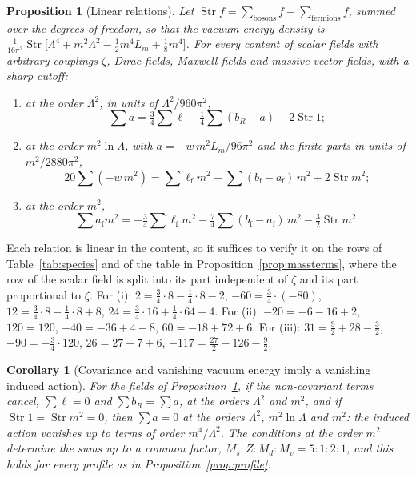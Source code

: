 \documentclass[11pt,a4paper]{article}
\makeatletter
\theoremstyle{stmt}
\newtheorem{proposition}[theorem]{Proposition}
\newtheorem{corollary}[theorem]{Corollary}
\theoremstyle{defn}
\theoremstyle{rmk}
\renewenvironment{proof}[1][\proofname]{\par\pushQED{\qed}\normalfont\topsep6\p@\@plus6\p@\relax
  \trivlist\item[\hskip\labelsep{\sffamily\itshape\small #1.}]\ignorespaces}{\popQED\endtrivlist\@endpefalse}
\numberwithin{equation}{section}
\makeatother
\begin{document}
\begin{proposition}[Linear relations]\label{prop:relations}
Let $\operatorname{Str}f=\sum_{\mathrm{bosons}}f-\sum_{\mathrm{fermions}}f$, summed over the degrees of freedom, so that the vacuum energy density is $\frac1{16\pi^2}\operatorname{Str}\big[\Lambda^4+m^2\Lambda^2-\tfrac12m^4L_m+\tfrac18m^4\big]$. For every content of scalar fields with arbitrary couplings $\zeta$, Dirac fields, Maxwell fields and massive vector fields, with a sharp cutoff:
\begin{enumerate}[label=\textup{(\roman*)}]
\item at the order $\Lambda^2$, in units of $\Lambda^2/960\pi^2$,
\[
\sum a=\tfrac34\sum\ell-\tfrac14\sum(b_R-a)-2\operatorname{Str}1;
\]
\item at the order $m^2\ln\Lambda$, with $a=-w\,m^2L_m/96\pi^2$ and the finite parts in units of $m^2/2880\pi^2$,
\[
20\sum(-w\,m^2)=\sum\ell_{\mathrm f}m^2+\sum(b_{\mathrm f}-a_{\mathrm f})\,m^2+2\operatorname{Str}m^2;
\]
\item at the order $m^2$,
\[
\sum a_{\mathrm f}m^2=-\tfrac34\sum\ell_{\mathrm f}m^2-\tfrac74\sum(b_{\mathrm f}-a_{\mathrm f})\,m^2-\tfrac32\operatorname{Str}m^2 .
\]
\end{enumerate}
\end{proposition}

\begin{proof}
Each relation is linear in the content, so it suffices to verify it on the rows of Table~\ref{tab:species} and of the table in Proposition~\ref{prop:massterms}, where the row of the scalar field is split into its part independent of $\zeta$ and its part proportional to $\zeta$. For (i): $2=\tfrac34\cdot8-\tfrac14\cdot8-2$, $-60=\tfrac34\cdot(-80)$, $12=\tfrac34\cdot8-\tfrac14\cdot8+8$, $24=\tfrac34\cdot16+\tfrac14\cdot64-4$. For (ii): $-20=-6-16+2$, $120=120$, $-40=-36+4-8$, $60=-18+72+6$. For (iii): $31=\tfrac92+28-\tfrac32$, $-90=-\tfrac34\cdot120$, $26=27-7+6$, $-117=\tfrac{27}2-126-\tfrac92$.
\end{proof}

\begin{corollary}[Covariance and vanishing vacuum energy imply a vanishing induced action]\label{cor:vanish}
For the fields of Proposition~\ref{prop:relations}, if the non-covariant terms cancel, $\sum\ell=0$ and $\sum b_R=\sum a$, at the orders $\Lambda^2$ and $m^2$, and if $\operatorname{Str}1=\operatorname{Str}m^2=0$, then $\sum a=0$ at the orders $\Lambda^2$, $m^2\ln\Lambda$ and $m^2$: the induced action vanishes up to terms of order $m^4/\Lambda^2$. The conditions at the order $m^2$ determine the sums up to a common factor, $M_s:Z:M_d:M_v=5:1:2:1$, and this holds for every profile as in Proposition~\ref{prop:profile}.
\end{corollary}
\end{document}
